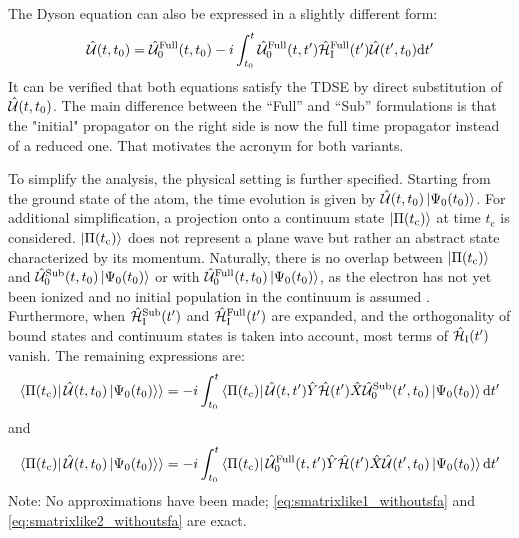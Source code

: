 The Dyson equation can also be expressed in a slightly different form:
\begin{equation}
    \hat{\mathcal{U}}(t,t_0)=\hat{\mathcal{U}}^{\mathrm{Full}}_0(t,t_0)-i\int_{t_0}^{t} \hat{\mathcal{U}}^{\mathrm{Full}}_0(t,t')\hat{\mathcal{H}}^{\mathrm{Full}}_{\mathrm{I}}(t')\hat{\mathcal{U}}(t',t_0) \mathrm{d} t'       \label{eq:dysonAnsatztRecX}
\end{equation}
It can be verified that both equations satisfy the TDSE by direct substitution of $\hat{\mathcal{U}}(t,t_0)$.
The main difference between the ``Full'' and ``Sub'' formulations is that the "initial" propagator on the right side is now the full time propagator instead of a reduced one.
That motivates the acronym for both variants.

To simplify the analysis, the physical setting is further specified.
Starting from the ground state of the atom, the time evolution is given by $\hat{\mathcal{U}}(t,t_0)\ket{\Psi_0(t_0)}$.
For additional simplification, a projection onto a continuum state $\ket{\Pi(t_{\mathrm{c}})}$ at time $t_{\mathrm{c}}$ is considered.
$\ket{\Pi(t_{\mathrm{c}})}$ does not represent a plane wave but rather an abstract state characterized by its momentum.
Naturally, there is no overlap between $\ket{\Pi(t_{\mathrm{c}})}$ and $\hat{\mathcal{U}}^{\mathrm{Sub}}_0(t,t_0)\ket{\Psi_0(t_0)}$ or with $\hat{\mathcal{U}}^{\mathrm{Full}}_0(t,t_0)\ket{\Psi_0(t_0)}$, as the electron has not yet been ionized and no initial population in the continuum is assumed \cite{Ivanov20012005}.
Furthermore, when $\hat{\mathcal{H}}^{\mathrm{Sub}}_{\mathrm{I}}(t')$ and $\hat{\mathcal{H}}^{\mathrm{Full}}_{\mathrm{I}}(t')$ are expanded, and the orthogonality of bound states and continuum states is taken into account, most terms of $\hat{\mathcal{H}}_{\mathrm{I}}(t')$ vanish.
The remaining expressions are:
\begin{equation}
    \braket{\Pi(t_{\mathrm{c}})|\,\hat{\mathcal{U}}(t,t_0)\ket{\Psi_0(t_0)}} = -i \int_{t_0}^{t} \bra{\Pi(t_{\mathrm{c}})} \hat{\mathcal{U}}(t,t')\hat{Y}\hat{\mathcal{H}}(t')\hat{X} \hat{\mathcal{U}}^{\mathrm{Sub}}_0(t',t_0)\ket{\Psi_0(t_0)} \mathrm{d} t' \label{eq:smatrixlike1_withoutsfa}
\end{equation}
and
\begin{equation}
    \braket{\Pi(t_{\mathrm{c}})|\,\hat{\mathcal{U}}(t,t_0)\ket{\Psi_0(t_0)}} = -i \int_{t_0}^{t} \bra{\Pi(t_{\mathrm{c}})} \hat{\mathcal{U}}^{\mathrm{Full}}_0(t,t')\hat{Y}\hat{\mathcal{H}}(t')\hat{X} \hat{\mathcal{U}}(t',t_0)\ket{\Psi_0(t_0)} \mathrm{d} t' \label{eq:smatrixlike2_withoutsfa}
\end{equation}
Note: No approximations have been made; \eqref{eq:smatrixlike1_withoutsfa} and \eqref{eq:smatrixlike2_withoutsfa} are exact.













